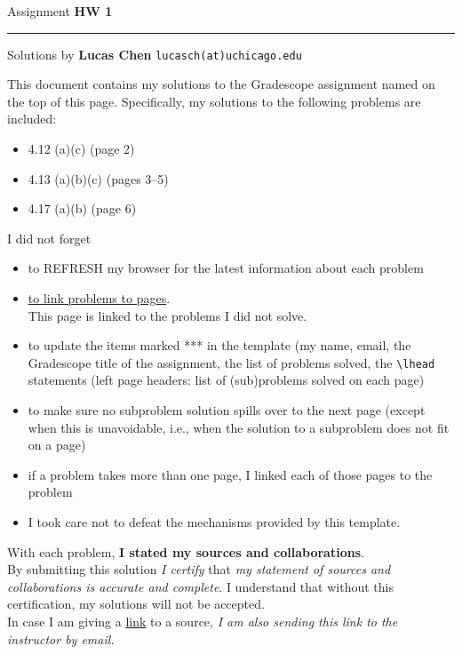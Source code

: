 \documentclass{amsart}
\begin{document}
\Large
\noindent
Assignment {\bf HW 1}   %

\medskip\noindent
\hrule


\medskip\noindent
Solutions by {\bf Lucas Chen} \qquad   %
  {\tt lucasch(at)uchicago.edu}      %

\vspace{0.5cm}

\noindent
This document contains my solutions to
the Gradescope assignment named on the top of this page.
Specifically, my solutions to the following problems
are included:

\vspace{0.4cm}
\begin{itemize}  %
\item 4.12 (a)(c)    \quad (page 2)
\item 4.13 (a)(b)(c)  \quad (pages 3--5)
\item 4.17 (a)(b)  \quad (page 6)
\end{itemize}

\vspace{0.5cm}

\noindent
I did not forget 
\begin{itemize}
  \item to REFRESH my browser for the latest information
   about each problem
  \item \underline{to link problems to pages}.\\
  This page is linked to the problems I did not solve.
\item to update the items marked *** in the template
  (my name, email, the Gradescope title of the assignment,
  the list of problems solved, the \verb>\lhead> statements
  (left page headers: list of (sub)problems solved on each page)
\item to make sure no subproblem solution spills over to the next page
  (except when this is unavoidable, i.e., when the solution to a
  subproblem does not fit on a page)
\item if a problem takes more than one page, I linked
  each of those pages to the problem
\item I took care not to defeat the mechanisms provided by this template.
\end{itemize}
  With each problem, {\bf I stated my sources and collaborations}.\\
  By submitting this solution \emph{I certify} that
  \emph{my statement of sources and collaborations is accurate and complete}.
  I understand that without this certification, my solutions will not be accepted.\\
  In case I am giving a \underline{link} to a source, \emph{I am also sending this link
  to the instructor by email.}
  
\end{document}
